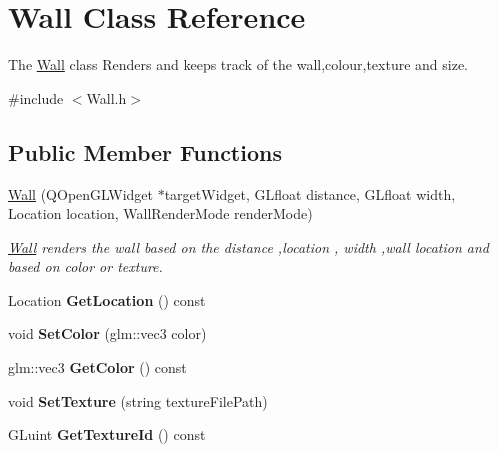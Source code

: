 \hypertarget{class_wall}{}\section{Wall Class Reference}
\label{class_wall}


The \hyperlink{class_wall}{Wall} class Renders and keeps track of the wall,colour,texture and size.  




{\ttfamily \#include $<$Wall.\+h$>$}

\subsection*{Public Member Functions}
\begin{DoxyCompactItemize}
\item 
\hyperlink{class_wall_a63c0ce873bd396cd64328bc789d9b52d}{Wall} (Q\+Open\+G\+L\+Widget $\ast$target\+Widget, G\+Lfloat distance, G\+Lfloat width, Location location, Wall\+Render\+Mode render\+Mode)
\begin{DoxyCompactList}\small\item\em \hyperlink{class_wall}{Wall} renders the wall based on the distance ,location , width ,wall location and based on color or texture. \end{DoxyCompactList}\item 
\hypertarget{class_wall_a69e3d769d03cc7710cff5ec12016d041}{}Location {\bfseries Get\+Location} () const \label{class_wall_a69e3d769d03cc7710cff5ec12016d041}

\item 
\hypertarget{class_wall_a25a9a26b711c82e87b4c62c0f0e310a4}{}void {\bfseries Set\+Color} (glm\+::vec3 color)\label{class_wall_a25a9a26b711c82e87b4c62c0f0e310a4}

\item 
\hypertarget{class_wall_a702eceba533217b2c8fe32e35bdc1a55}{}glm\+::vec3 {\bfseries Get\+Color} () const \label{class_wall_a702eceba533217b2c8fe32e35bdc1a55}

\item 
\hypertarget{class_wall_a6fc29461ede774d8d87019b7f002d15a}{}void {\bfseries Set\+Texture} (string texture\+File\+Path)\label{class_wall_a6fc29461ede774d8d87019b7f002d15a}

\item 
\hypertarget{class_wall_a37e7497af0a99b1093dd54dfd6bd90cf}{}G\+Luint {\bfseries Get\+Texture\+Id} () const \label{class_wall_a37e7497af0a99b1093dd54dfd6bd90cf}


\end{DoxyCompactItemize}
